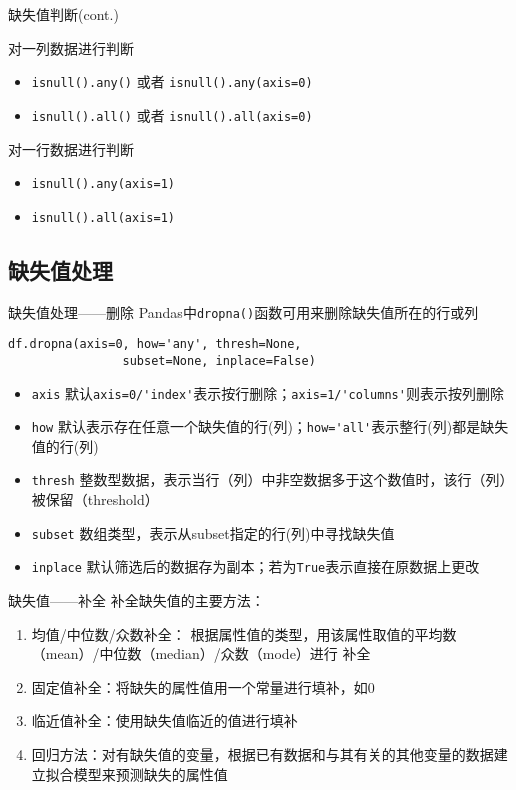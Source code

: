 \documentclass[t]{beamer}
\begin{document}
\begin{frame}[fragile]{缺失值判断(cont.)}
\begin{block}{对一列数据进行判断}
\begin{itemize}
    \item \verb|isnull().any()| 或者 \verb|isnull().any(axis=0)|
    \item \verb|isnull().all()| 或者 \verb|isnull().all(axis=0)|
\end{itemize}
\end{block}

\begin{block}{对一{\color{red}行}数据进行判断}
    \begin{itemize}
        \item \verb|isnull().any(axis=1)| 
        \item \verb|isnull().all(axis=1)| 
    \end{itemize}
    \end{block}
\end{frame}

\subsection{缺失值处理}

\begin{frame}[fragile]{缺失值处理——删除}
Pandas中\verb|dropna()|函数可用来删除缺失值所在的行或列
\begin{lstlisting}
df.dropna(axis=0, how='any', thresh=None,
                subset=None, inplace=False)
\end{lstlisting}
\normalsize
\begin{itemize}
    \item \verb|axis| 默认\verb|axis=0/'index'|表示按行删除；\verb|axis=1/'columns'|则表示按列删除
    \item \verb|how| 默认表示存在任意一个缺失值的行(列)；\verb|how='all'|表示整行(列)都是缺失值的行(列)
    \item \verb|thresh| 整数型数据，表示当行（列）中非空数据多于这个数值时，该行（列）被保留（{\color{red}thresh}old）
    \item \verb|subset| 数组类型，表示从subset指定的行(列)中寻找缺失值
    \item \verb|inplace| 默认筛选后的数据存为副本；若为\verb|True|表示直接在原数据上更改
\end{itemize}
\end{frame}

\begin{frame}[fragile]{缺失值——补全}
    补全缺失值的主要方法：
\begin{enumerate}
    \item 均值/中位数/众数补全：
    根据属性值的类型，用该属性取值的平均数（mean）/中位数（median）/众数（mode）进行
    补全
    \item 固定值补全：将缺失的属性值用一个常量进行填补，如0
    \item 临近值补全：使用缺失值临近的值进行填补
    \item 回归方法：对有缺失值的变量，根据已有数据和与其有关的其他变量的数据建立拟合模型来预测缺失的属性值
\end{enumerate}
\end{frame}
\end{document}
